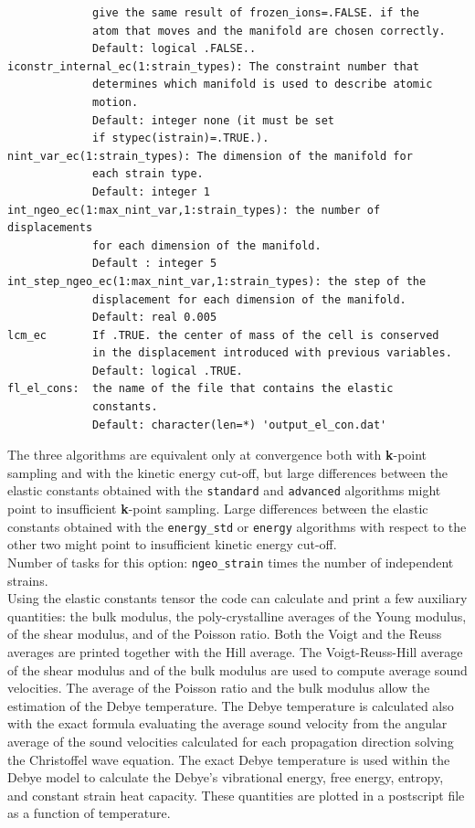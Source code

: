 \documentclass[12pt,a4paper,twoside]{report}
\begin{document}
\begin{verbatim}
             give the same result of frozen_ions=.FALSE. if the 
             atom that moves and the manifold are chosen correctly.
             Default: logical .FALSE..
iconstr_internal_ec(1:strain_types): The constraint number that 
             determines which manifold is used to describe atomic 
             motion.
             Default: integer none (it must be set 
             if stypec(istrain)=.TRUE.).
nint_var_ec(1:strain_types): The dimension of the manifold for 
             each strain type.
             Default: integer 1 
int_ngeo_ec(1:max_nint_var,1:strain_types): the number of displacements
             for each dimension of the manifold.
             Default : integer 5 
int_step_ngeo_ec(1:max_nint_var,1:strain_types): the step of the 
             displacement for each dimension of the manifold.
             Default: real 0.005
lcm_ec       If .TRUE. the center of mass of the cell is conserved 
             in the displacement introduced with previous variables.
             Default: logical .TRUE.
fl_el_cons:  the name of the file that contains the elastic 
             constants.
             Default: character(len=*) 'output_el_con.dat'
\end{verbatim}

The three algorithms are equivalent only at convergence both with
{\bf k}-point sampling and with the kinetic energy cut-off, but 
large differences between the elastic constants obtained with the 
\texttt{standard} and \texttt{advanced} algorithms might point to 
insufficient {\bf k}-point sampling. Large differences between the 
elastic constants obtained with the \texttt{energy\_std} or \texttt{energy}
algorithms with respect 
to the other two might point to insufficient kinetic energy cut-off. \\
Number of tasks for this option: \texttt{ngeo\_strain} times the number of
independent strains. \\

Using the elastic constants tensor the code can calculate and print
a few auxiliary quantities:
the bulk modulus, the poly-crystalline averages of the Young modulus,
of the shear modulus, and of the Poisson ratio. Both the Voigt and the
Reuss averages are printed together with the Hill average.
The Voigt-Reuss-Hill average of the shear modulus and of the bulk modulus are 
used to compute average sound velocities. The average of the Poisson ratio and
the bulk modulus allow the estimation of the Debye 
temperature. The Debye temperature is calculated also with the exact 
formula evaluating the average sound 
velocity from the angular average of the sound velocities calculated 
for each propagation direction solving the Christoffel wave equation.
The exact Debye temperature is used within the Debye model to calculate the
Debye's vibrational energy, free energy, entropy, and constant strain heat
capacity. These quantities are plotted in a postscript file as a function
of temperature.
\end{document}
